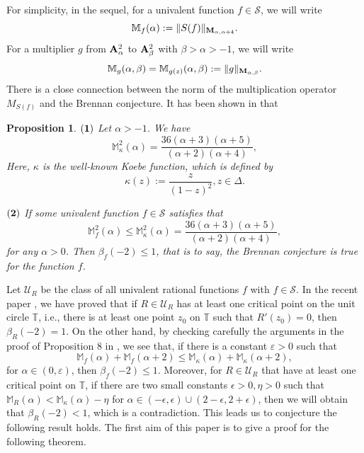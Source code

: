 \documentclass[10pt]{amsart}
\newtheorem{proposition}[theorem]{Proposition}
\theoremstyle{definition}    %
\numberwithin{equation}{section}
\begin{document}
For simplicity, in the sequel, for a univalent function $f\in \mathcal{S}$, we will write 
$$\mathbb{M}_f(\alpha):=\|S(f)\|_{{\bf M}_{\alpha, \alpha+4}}.$$
For a multiplier $g$ from ${\bf A}_{\alpha}^2$ to ${\bf A}_{\beta}^2$ with $\beta>\alpha>-1$, we will write
$$\mathbb{M}_g(\alpha, \beta)=\mathbb{M}_{g(z)}(\alpha, \beta):=\|g\|_{{\bf M}_{\alpha, \beta}}.$$
There is a close connection between the norm of the multiplication operator ${M}_{S(f)}$ and the Brennan conjecture. 
It has been shown in \cite{SS} that 
 \begin{proposition}\label{last-p}
${\bf (1)}$ Let $\alpha>-1$. We have
\begin{equation} \mathbb{M}_{\kappa}^2(\alpha)=\frac{36(\alpha+3)(\alpha+5)}{(\alpha+2)(\alpha+4)},\nonumber \end{equation}
Here, $\kappa$ is the well-known Koebe function, which is defined by
 $$\kappa(z):=\frac{z}{(1-z)^2}, z\in \Delta.$$

${\bf (2)}$ If some univalent function $f\in \mathcal{S}$ satisfies that
\begin{equation} \mathbb{M}_f^2(\alpha) \leq\mathbb{M}_{\kappa}^2(\alpha)=\frac{36(\alpha+3)(\alpha+5)}{(\alpha+2)(\alpha+4)},\nonumber \end{equation}
 for any $\alpha>0$. Then $\beta_f(-2)\leq 1$, that is to say, the Brennan conjecture is true for the function $f$. 
 \end{proposition}
 
Let $\mathcal{U}_R$ be the class of all univalent rational functions $f$ with $f\in\mathcal{S}$. In the recent paper \cite{Jin-c}, we have proved that
if $R\in \mathcal{U}_R$ has at least one critical point on the unit circle $\mathbb{T}$, i.e., there is at least one point $z_0$ on $\mathbb{T}$ such that $R'(z_0)=0$, then $\beta_R(-2)=1$. 
On the other hand, by checking carefully the arguments in the proof of Proposition $8$ in \cite[Page 1632]{SS}, we see that, if there is a constant $\varepsilon>0$ such that $$\mathbb{M}_f(\alpha)+\mathbb{M}_f(\alpha+2)\leq \mathbb{M}_{\kappa}(\alpha)+\mathbb{M}_{\kappa}(\alpha+2),$$
for $\alpha\in (0,\varepsilon)$, then $\beta_f({-2})\leq 1$. Moreover, for $R\in \mathcal{U}_R$ that have at least one critical point on $\mathbb{T}$, if there are two small constants $\epsilon>0, \eta>0$ such that $\mathbb{M}_R(\alpha)<\mathbb{M}_{\kappa}(\alpha)-\eta$
for $\alpha \in (-\epsilon, \epsilon)\cup (2-\epsilon,2+\epsilon)$, then we will obtain that $\beta_{R}(-2)<1$, which is a contradiction. This leads us to conjecture the following result holds. 
The first aim of this paper is to give a proof for the following theorem. 
\end{document}

